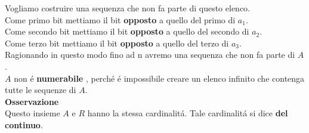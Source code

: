 \documentclass[11pt]{article}
\begin{document}
            Vogliamo costruire una sequenza che non fa parte di questo elenco. \\
            Come primo bit mettiamo il bit \textbf{opposto} a quello del primo di $a_{1}$.\\
            Come secondo bit mettiamo il bit \textbf{opposto} a quello del secondo di $a_{2}$.\\
            Come terzo bit mettiamo il bit \textbf{opposto} a quello del terzo di $a_{3}$.\\
            Ragionando in questo modo fino ad n avremo una sequenza che non fa parte di $A$.
            \\$A$ non \'e \textbf{numerabile} , perch\'e \'e impossibile creare un elenco infinito che contenga tutte le sequenze di $A$.\\
            \textbf{Osservazione}\\ 
            Questo insieme $A$ e $R$ hanno la stessa cardinalit\'a. Tale cardinalit\'a si dice \textbf{del continuo}.
             
            
            
    
    
    
        
\end{document}
